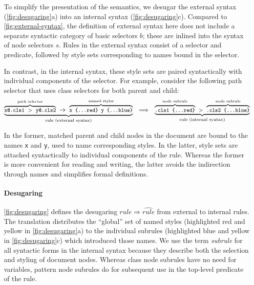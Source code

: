\documentclass[acmsmall, screen]{acmart}
\newcommand{\parahead}[1]
  {\paragraph{\textbf{#1}}}
\newcommand{\varGuardedRule}{\mathit{rule}}
\newcommand{\varBasicSelector}{b} \newcommand{\varNodeSelector}{s}
\newcommand{\varInternalRule}{\widehat{\varGuardedRule}}
\newcommand{\opChild}{>}
\begin{document}
To simplify the presentation of the semantics, we desugar the external syntax (\autoref{fig:desugaring}a) into an internal syntax (\autoref{fig:desugaring}c).
Compared to \autoref{fig:external-syntax}, the definition of external syntax here does not include a separate syntactic category of basic selectors $\varBasicSelector$; these are inlined into the syntax of node selectors $\varNodeSelector$.
Rules in the external syntax consist of a selector and predicate, followed by style sets corresponding to names bound in the selector.

In contrast, in the internal syntax, these style sets are paired syntactically with individual components of the selector.
For example, consider the following path selector that uses class selectors for both parent and child:
$$
\small
\underbrace{
\overbrace{{\texttt{x@.cls1}\ \opChild \ \texttt{y@.cls2}}}^{\textrm{path selector}}\texttt{ -> }\overbrace{\texttt{x \{...red\} y \{...blue\}}}^{\textrm{named styles}}
}_{\textrm{rule (external syntax)}}
\hspace{0.10in}
\Longrightarrow
\hspace{0.10in}
\underbrace{
\overbrace{\texttt{.cls1 \{...red\}}}^{\textrm{node subrule}}\ \opChild\ \overbrace{\texttt{.cls2 \{...blue\}}}^{\textrm{node subrule}}
}_{\textrm{rule (internal syntax)}}
$$

\noindent
In the former, matched parent and child nodes in the document are bound to the names \texttt{x} and \texttt{y}, used to name corresponding styles.
In the latter, style sets are attached syntactically to individual components of the rule.
Whereas the former is more convenient for reading and writing, the latter avoids the indirection through names and simplifies formal definitions.

\parahead{Desugaring}

\autoref{fig:desugaring} defines the desugaring $\varGuardedRule \Longrightarrow \varInternalRule$ from external to internal rules.
The translation distributes the ``global'' set of named styles (highlighted red and yellow in \autoref{fig:desugaring}a) to the individual subrules (highlighted blue and yellow in \autoref{fig:desugaring}c) which introduced those names.
We use the term \emph{subrule} for all syntactic forms in the internal syntax because they describe both the selection and styling of document nodes.
Whereas class node subrules have no need for variables, pattern node subrules do for subsequent use in the top-level predicate of the rule.
\end{document}
